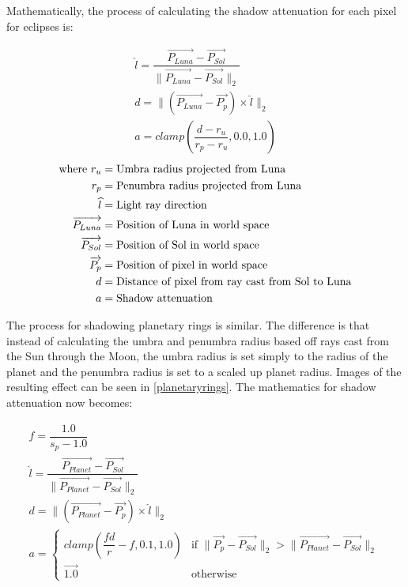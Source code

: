 Mathematically, the process of calculating the shadow attenuation for each pixel for eclipses is:

\singlespacing
\begin{align}
\widehat{l} =\dfrac{ \overrightarrow{P_{Luna}}-\overrightarrow{P_{Sol}}}{ \| \overrightarrow{P_{Luna}}-\overrightarrow{P_{Sol}}\|_2} \\
d = \| (\overrightarrow{P_{Luna}}-\overrightarrow{P_{p}}) \times \widehat{l} \|_2 \\
a = clamp(\dfrac{d - r_u}{r_p - r_u}, 0.0, 1.0)
\end{align}
\begin{align*}
\text{where}~
r_u &= \text{Umbra radius projected from Luna} \notag\\
r_p &= \text{Penumbra radius projected from Luna} \notag\\
\widehat{l} &= \text{Light ray direction} \notag\\
\overrightarrow{P_{Luna}} &= \text{Position of Luna in world space} \notag\\
\overrightarrow{P_{Sol}} &= \text{Position of Sol in world space} \notag\\
\overrightarrow{P_{p}} &= \text{Position of pixel in world space} \notag\\
d &= \text{Distance of pixel from ray cast from Sol to Luna} \notag\\
a &= \text{Shadow attenuation} \notag\\
\end{align*}
\onehalfspacing

\pagebreak

The process for shadowing planetary rings is similar. The difference is that instead of calculating the umbra and penumbra radius based off rays cast from the Sun through the Moon, the umbra radius is set simply to the radius of the planet and the penumbra radius is set to a scaled up planet radius. Images of the resulting effect can be seen in \cref{planetaryrings}. The mathematics for shadow attenuation now becomes:

\singlespacing
\begin{align}
f = \dfrac{1.0}{s_p-1.0} \\
\widehat{l} =\dfrac{ \overrightarrow{P_{Planet}}-\overrightarrow{P_{Sol}}}{ \| \overrightarrow{P_{Planet}}-\overrightarrow{P_{Sol}}\|_2} \\
d = \| (\overrightarrow{P_{Planet}}-\overrightarrow{P_{p}}) \times \widehat{l} \|_2 \\
a = \begin{cases} clamp(\dfrac{fd}{r}-f, 0.1, 1.0)  &\mbox{if } \|\overrightarrow{P_{p}}-\overrightarrow{P_{Sol}}\|_2 > \|\overrightarrow{P_{Planet}}-\overrightarrow{P_{Sol}}\|_2 \\ 
\overrightarrow{1.0} & \mbox{otherwise} \end{cases} \\
\end{align}

